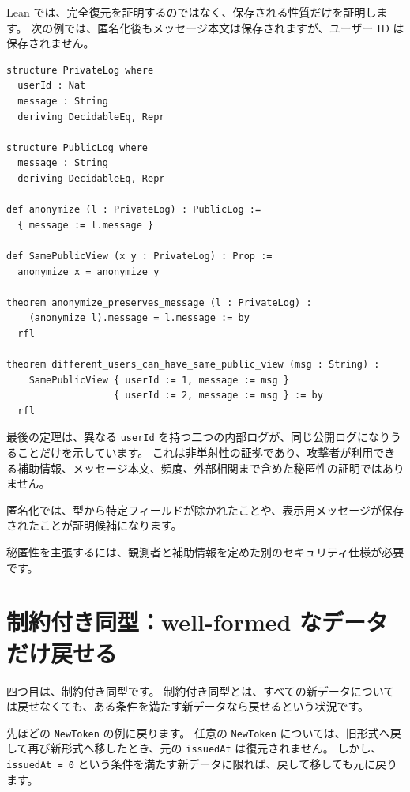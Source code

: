 Lean では、完全復元を証明するのではなく、保存される性質だけを証明します。
次の例では、匿名化後もメッセージ本文は保存されますが、ユーザー ID は保存されません。

\begin{listing}[htbp]
\begin{verbatim}
structure PrivateLog where
  userId : Nat
  message : String
  deriving DecidableEq, Repr

structure PublicLog where
  message : String
  deriving DecidableEq, Repr

def anonymize (l : PrivateLog) : PublicLog :=
  { message := l.message }

def SamePublicView (x y : PrivateLog) : Prop :=
  anonymize x = anonymize y

theorem anonymize_preserves_message (l : PrivateLog) :
    (anonymize l).message = l.message := by
  rfl

theorem different_users_can_have_same_public_view (msg : String) :
    SamePublicView { userId := 1, message := msg }
                   { userId := 2, message := msg } := by
  rfl
\end{verbatim}
\caption{\texttt{anonymize}}
\label{lst:ch27-lossy-log}
\end{listing}

最後の定理は、異なる \texttt{userId} を持つ二つの内部ログが、同じ公開ログになりうることだけを示しています。
これは非単射性の証拠であり、攻撃者が利用できる補助情報、メッセージ本文、頻度、外部相関まで含めた秘匿性の証明ではありません。

匿名化では、型から特定フィールドが除かれたことや、表示用メッセージが保存されたことが証明候補になります。

秘匿性を主張するには、観測者と補助情報を定めた別のセキュリティ仕様が必要です。

\section{制約付き同型：well-formed なデータだけ戻せる}

四つ目は、制約付き同型です。
制約付き同型とは、すべての新データについては戻せなくても、ある条件を満たす新データなら戻せるという状況です。

先ほどの \texttt{NewToken} の例に戻ります。
任意の \texttt{NewToken} については、旧形式へ戻して再び新形式へ移したとき、元の \texttt{issuedAt} は復元されません。
しかし、\texttt{issuedAt = 0} という条件を満たす新データに限れば、戻して移しても元に戻ります。

